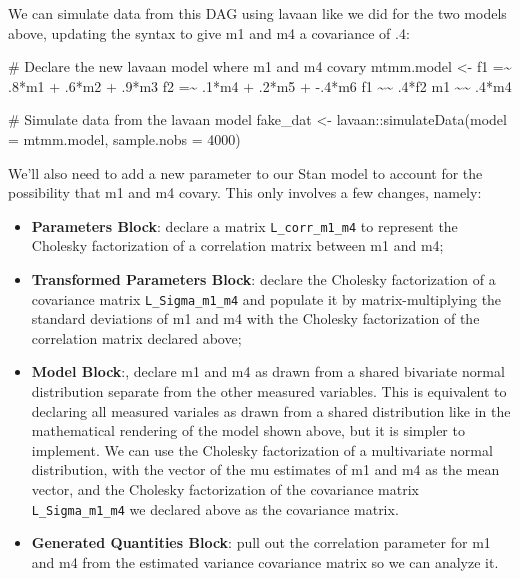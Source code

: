 \documentclass[
  letterpaper,
  DIV=11,
  numbers=noendperiod]{scrreprt}
\newenvironment{Shaded}{\begin{snugshade}}{\end{snugshade}}
\newcommand{\AttributeTok}[1]{\textcolor[rgb]{0.40,0.45,0.13}{#1}}
\newcommand{\CommentTok}[1]{\textcolor[rgb]{0.37,0.37,0.37}{#1}}
\newcommand{\DecValTok}[1]{\textcolor[rgb]{0.68,0.00,0.00}{#1}}
\newcommand{\FunctionTok}[1]{\textcolor[rgb]{0.28,0.35,0.67}{#1}}
\newcommand{\NormalTok}[1]{\textcolor[rgb]{0.00,0.23,0.31}{#1}}
\newcommand{\OtherTok}[1]{\textcolor[rgb]{0.00,0.23,0.31}{#1}}
\newcommand{\SpecialCharTok}[1]{\textcolor[rgb]{0.37,0.37,0.37}{#1}}
\newcommand{\StringTok}[1]{\textcolor[rgb]{0.13,0.47,0.30}{#1}}
\providecommand{\tightlist}{%
  \setlength{\itemsep}{0pt}\setlength{\parskip}{0pt}}\usepackage{longtable,booktabs,array}
\begin{document}
We can simulate data from this DAG using lavaan like we did for the two
models above, updating the syntax to give m1 and m4 a covariance of .4:

\begin{Shaded}
\begin{Highlighting}[]
\CommentTok{\# Declare the new lavaan model where m1 and m4 covary}
\NormalTok{mtmm.model }\OtherTok{\textless{}{-}} \StringTok{\textquotesingle{} }
\StringTok{  f1 =\textasciitilde{} .8*m1 + .6*m2 + .9*m3}
\StringTok{  f2 =\textasciitilde{} .1*m4 + .2*m5 + {-}.4*m6}
\StringTok{  f1 \textasciitilde{}\textasciitilde{} .4*f2}
\StringTok{  m1 \textasciitilde{}\textasciitilde{} .4*m4}
\StringTok{\textquotesingle{}}

\CommentTok{\# Simulate data from the lavaan model}
\NormalTok{fake\_dat }\OtherTok{\textless{}{-}}\NormalTok{ lavaan}\SpecialCharTok{::}\FunctionTok{simulateData}\NormalTok{(}\AttributeTok{model =}\NormalTok{ mtmm.model, }\AttributeTok{sample.nobs =} \DecValTok{4000}\NormalTok{)}
\end{Highlighting}
\end{Shaded}

We'll also need to add a new parameter to our Stan model to account for
the possibility that m1 and m4 covary. This only involves a few changes,
namely:

\begin{itemize}
\tightlist
\item
  \textbf{Parameters Block}: declare a matrix \texttt{L\_corr\_m1\_m4}
  to represent the Cholesky factorization of a correlation matrix
  between m1 and m4;
\item
  \textbf{Transformed Parameters Block}: declare the Cholesky
  factorization of a covariance matrix \texttt{L\_Sigma\_m1\_m4} and
  populate it by matrix-multiplying the standard deviations of m1 and m4
  with the Cholesky factorization of the correlation matrix declared
  above;
\item
  \textbf{Model Block}:, declare m1 and m4 as drawn from a shared
  bivariate normal distribution separate from the other measured
  variables. This is equivalent to declaring all measured variales as
  drawn from a shared distribution like in the mathematical rendering of
  the model shown above, but it is simpler to implement. We can use the
  Cholesky factorization of a multivariate normal distribution, with the
  vector of the mu estimates of m1 and m4 as the mean vector, and the
  Cholesky factorization of the covariance matrix
  \texttt{L\_Sigma\_m1\_m4} we declared above as the covariance matrix.
\item
  \textbf{Generated Quantities Block}: pull out the correlation
  parameter for m1 and m4 from the estimated variance covariance matrix
  so we can analyze it.
\end{itemize}
\end{document}

